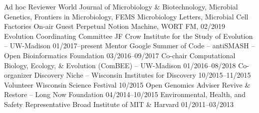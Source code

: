 

\begin{cvhonors}
  \cvhonor
    {Ad hoc Reviewer} %
    {World Journal of Microbiology \& Biotechnology, Microbial Genetics, Frontiers in Microbiology, FEMS Microbiology Letters, Microbial Cell Factories} %
    {} %
  \cvhonor
    {On-air Guest} %
    {Perpetual Notion Machine, WORT FM, \textbf{\textit{}}} %
    {02/2019} %
  \cvhonor
    {Evolution Coordinating Committee} %
    {JF Crow Institute for the Study of Evolution -- UW-Madison} %
    {01/2017--present} %
  \cvhonor
    {Mentor} %
    {Google Summer of Code -- antiSMASH -- Open Bioinformatics Foundation} %
    {03/2016--09/2017} %
  \cvhonor
    {Co-chair} %
    {Computational Biology, Ecology, \& Evolution (ComBEE) -- UW-Madison} %
    {01/2016--08/2018} %
  \cvhonor
    {Co-organizer} %
    {Discovery Niche -- Wisconsin Institutes for Discovery} %
    {10/2015--11/2015} %
  \cvhonor
    {Volunteer} %
    {Wisconsin Science Festival} %
    {10/2015} %
  \cvhonor
    {Open Genomics Adviser} %
    {Revive \& Restore -- Long Now Foundation} %
    {04/2014--10/2015} %
  \cvhonor
    {Environmental, Health, and Safety Representative} %
    {Broad Institute of MIT \& Harvard} %
    {01/2011--03/2013} %
\end{cvhonors}